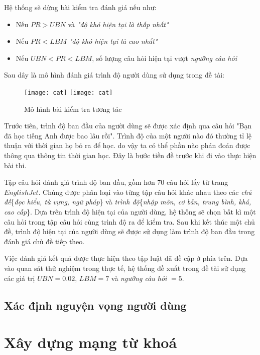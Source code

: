 Hệ thống sẽ dừng bài kiểm tra đánh giá nếu như:
\begin{itemize}
	\item Nếu $PR > UBN$ và \textit{"độ khó hiện tại là thấp nhất"}
	\item Nếu $PR < LBM$ \textit{"độ khó hiện tại là cao nhất"}
	\item Nếu $UBN < PR < LBM$, số lượng câu hỏi hiện tại vượt \textit{ngưỡng câu hỏi}
\end{itemize}

Sau dây là mô hình đánh giá trình độ người dùng sử dụng trong đề tài:

\begin{figure}[H]
  \begin{center}
    \ifpdf
      \texttt{[image: cat]}
    \else
      \texttt{[image: cat]}
    \fi
    \caption{Mô hình bài kiểm tra tương tác}
    \label{CATModel}
  \end{center}
\end{figure}

Trước tiên, trình độ ban đầu của người dùng sẽ được xác định qua câu hỏi "Bạn đã học tiếng Anh được bao lâu rồi". Trình độ của một người nào đó thường tỉ lệ thuận với thời gian họ bỏ ra để học.  do vậy ta có thể phần nào phán đoán được thông qua thông tin thời gian học. Đây là bước tiền đề trước khi đi vào thực hiện bài thi.

Tập câu hỏi đánh giá trình độ ban đầu, gồm hơn 70 câu hỏi lấy từ trang $EnglishJet$. Chúng được phân loại vào từng tập câu hỏi khác nhau theo các \textit{chủ đề}\{\textit{đọc hiểu, từ vựng, ngữ pháp}\} và \textit{trình độ}\{\textit{nhập môn, cơ bản, trung bình, khá, cao cấp}\}. Dựa trên trình độ hiện tại của người dùng, hệ thống sẽ chọn bất kì một câu hỏi trong tập câu hỏi cùng trình độ ra để kiểm tra. Sau khi kết thúc một chủ đề, trình độ hiện tại của người dùng sẽ được sử dụng làm trình độ ban đầu trong đánh giá chủ đề tiếp theo.

 Việc đánh giá kết quả được thực hiện theo tập luật đã đề cập ở phía trên. Dựa vào quan sát thử nghiệm trong thực tế, hệ thống đề xuất trong đề tài sử dụng các giá trị $UBN = 0.02$, $LBM = 7$ và \textit{ngưỡng câu hỏi} $= 5$.
 
 \subsection{Xác định nguyện vọng người dùng}
\section{Xây dựng mạng từ khoá}


